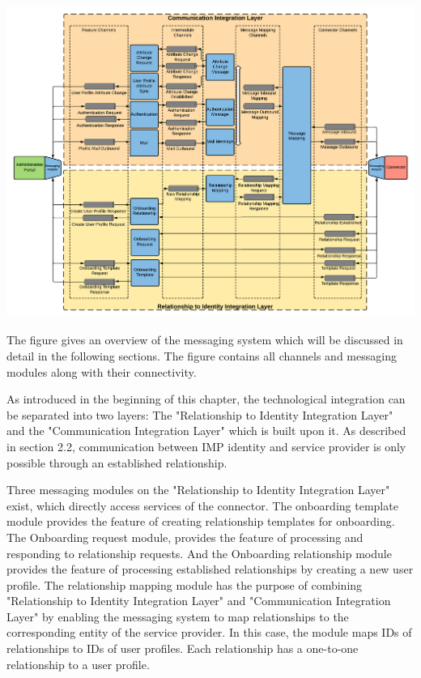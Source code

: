 \begin{center}
    \includegraphics[scale=0.5]{Diagrams/Integration Architecture 1/Technological Integration/4. Messaging Overview.pdf}
\end{center}

The figure gives an overview of the messaging system which will be discussed in detail in the following sections. The figure contains all channels and messaging modules along with their connectivity.

As introduced in the beginning of this chapter, the technological integration can be separated into two layers: The "Relationship to Identity Integration Layer" and the "Communication Integration Layer" which is built upon it. As described in section 2.2, communication between IMP identity and service provider is only possible through an established relationship.

Three messaging modules on the "Relationship to Identity Integration Layer" exist, which directly access services of the connector. The onboarding template module provides the feature of creating relationship templates for onboarding. The Onboarding request module, provides the feature of processing and responding to relationship requests. And the Onboarding relationship module provides the feature of processing established relationships by creating a new user profile. The relationship mapping module has the purpose of combining "Relationship to Identity Integration Layer" and "Communication Integration Layer" by enabling the messaging system to map relationships to the corresponding entity of the service provider. In this case, the module maps IDs of relationships to IDs of user profiles. Each relationship has a one-to-one relationship to a user profile.

